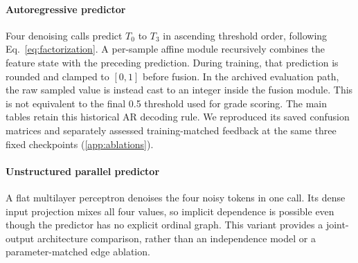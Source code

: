 \documentclass[a4paper,fleqn]{cas-sc}
\begin{document}
\paragraph{Autoregressive predictor}
Four denoising calls predict $T_0$ to $T_3$ in ascending threshold order, following Eq.~\eqref{eq:factorization}. A per-sample affine module recursively combines the feature state with the preceding prediction. During training, that prediction is rounded and clamped to $[0,1]$ before fusion. In the archived evaluation path, the raw sampled value is instead cast to an integer inside the fusion module. This is not equivalent to the final 0.5 threshold used for grade scoring. The main tables retain this historical AR decoding rule. We reproduced its saved confusion matrices and separately assessed training-matched feedback at the same three fixed checkpoints (\ref{app:ablations}).

\paragraph{Unstructured parallel predictor}
A flat multilayer perceptron denoises the four noisy tokens in one call. Its dense input projection mixes all four values, so implicit dependence is possible even though the predictor has no explicit ordinal graph. This variant provides a joint-output architecture comparison, rather than an independence model or a parameter-matched edge ablation.
\end{document}
